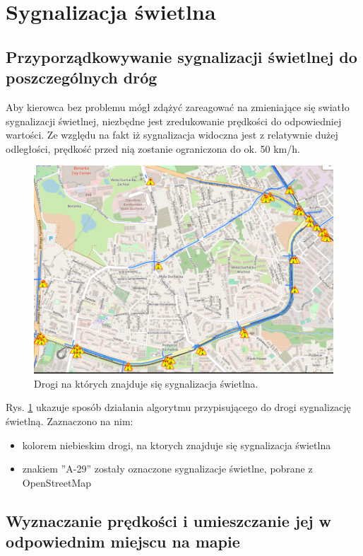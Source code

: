 \newpage
\section{Sygnalizacja świetlna}
\subsection{Przyporządkowywanie sygnalizacji świetlnej do poszczególnych dróg}

Aby kierowca bez problemu mógł zdążyć zareagować na zmieniające się swiatło sygnalizacji świetlnej, niezbędne jest zredukowanie prędkości do odpowiedniej wartości. Ze względu na fakt iż sygnalizacja widoczna jest z relatywnie dużej odległości, prędkość przed nią zostanie ograniczona do ok. 50 km/h.


\begin{figure}[h]
\caption{Drogi na których znajduje się sygnalizacja świetlna.}
\label{sec:PrzejazdyKolejowe}
\centering
\includegraphics[width=1.1\textwidth]{traffic_sight}
\end{figure}

Rys. \ref{sec:PrzejazdyKolejowe} ukazuje sposób działania algorytmu przypisującego do drogi sygnalizację świetlną. Zaznaczono na nim:
\begin{itemize}
\item kolorem niebieskim drogi, na ktorych znajduje się sygnalizacja świetlna
\item znakiem ''A-29'' zostały oznaczone sygnalizacje świetlne, pobrane z OpenStreetMap
\end{itemize}

\newpage
\subsection{Wyznaczanie prędkości i umieszczanie jej w odpowiednim miejscu na mapie}

